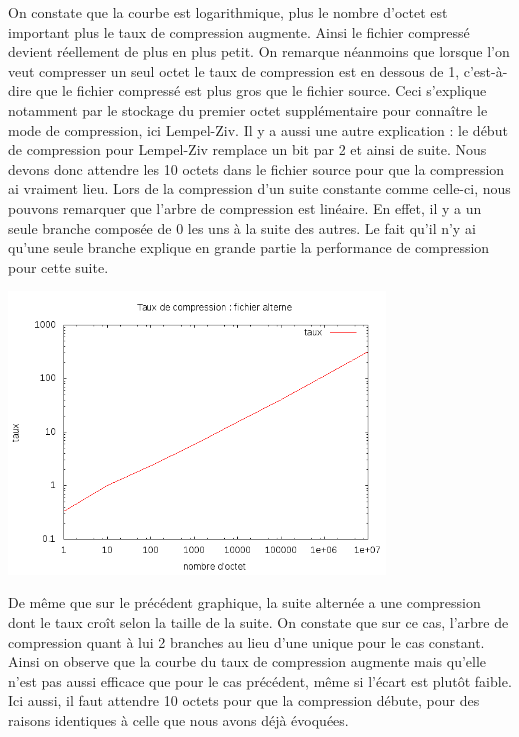 \documentclass{report}
\begin{document}
On constate que la courbe est logarithmique, plus le nombre d'octet est important plus le taux de compression augmente. Ainsi le fichier compressé devient réellement de plus en plus petit. 
On remarque néanmoins que lorsque l'on veut compresser un seul octet le taux de compression est en dessous de 1, c'est-à-dire que le fichier compressé est plus gros que le fichier source. Ceci s'explique notamment par le stockage du premier  octet supplémentaire pour connaître le mode de compression, ici Lempel-Ziv. Il y a aussi une autre explication :  le début de compression pour Lempel-Ziv remplace un bit par 2 et ainsi de suite. Nous devons donc attendre les 10 octets dans le fichier source pour que la compression ai vraiment lieu. 
Lors de la compression d'un suite constante comme celle-ci, nous pouvons remarquer que l'arbre de compression est linéaire. En effet, il y a un seule branche composée de 0 les uns à la suite des autres. Le fait qu'il n'y ai qu'une seule branche explique en grande partie la performance de compression pour cette suite. 

\begin{center}
\includegraphics[width=10cm]{LZAlterner.png}
\end{center}

De même que sur le précédent graphique, la suite alternée a une compression dont le taux croît selon la taille de la suite. On constate que sur ce cas, l'arbre de compression quant à lui 2 branches au lieu d'une unique pour le cas constant. Ainsi on observe que la courbe du taux de compression augmente mais qu'elle n'est pas aussi efficace que pour le cas précédent, même si l'écart est plutôt faible.
Ici aussi, il faut attendre 10 octets pour que la compression débute, pour des raisons identiques à celle que nous avons déjà évoquées.  
\end{document}
